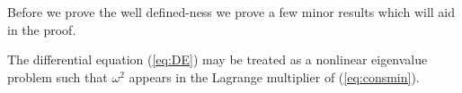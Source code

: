 Before we prove the well defined-ness we prove a few minor results which will aid in the proof.
\begin{lemma}\label{lem:nonlineig}
The differential equation (\ref{eq:DE}) may be treated as a nonlinear eigenvalue problem such that $\omega^2$ appears in the Lagrange multiplier of (\ref{eq:consmin}). 
\end{lemma}

